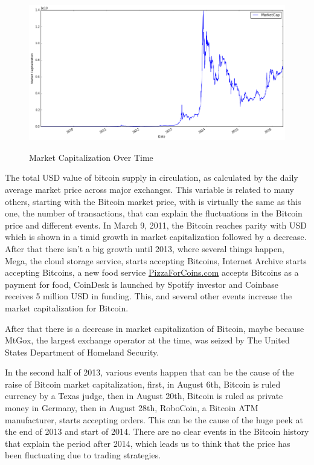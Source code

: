 \begin{figure}[bth]
  \myfloatalign
  {\includegraphics[width=1\linewidth]
    {gfx/market-cap-over-time}}
  \caption{Market Capitalization Over Time}
  \label{fig:market-cap-over-time}
\end{figure}

The total USD value of bitcoin supply in circulation, as calculated by
the daily average market price across major exchanges. This variable
is related to many others, starting with the Bitcoin market price,
with is virtually the same as this one, the number of transactions,
that can explain the fluctuations in the Bitcoin price and different
events. In March 9, 2011, the Bitcoin reaches parity with USD which is
shown in a timid growth in market capitalization followed by a
decrease. After that there isn't a big growth until 2013, where
several things happen, Mega, the cloud storage service, starts
accepting Bitcoins, Internet Archive starts accepting Bitcoins, a new
food service \href{PizzaForCoins.com}{PizzaForCoins.com} accepts
Bitcoins as a payment for food, CoinDesk is launched by Spotify
investor and Coinbase receives 5 million USD in funding. This, and
several other events increase the market capitalization for Bitcoin.

After that there is a decrease in market capitalization of Bitcoin,
maybe because MtGox, the largest exchange operator at the time, was
seized by The United States Department of Homeland Security.

In the second half of 2013, various events happen that can be the
cause of the raise of Bitcoin market capitalization, first, in August
6th, Bitcoin is ruled currency by a Texas judge, then in August 20th,
Bitcoin is ruled as private money in Germany, then in August 28th,
RoboCoin, a Bitcoin ATM manufacturer, starts accepting orders. This
can be the cause of the huge peek at the end of 2013 and start of
2014. There are no clear events in the Bitcoin history that explain
the period after 2014, which leads us to think that the price has been
fluctuating due to trading strategies.

